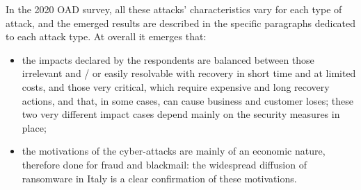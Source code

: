 \documentclass{easychair}
\begin{document}
In the 2020 OAD survey, all these attacks’ characteristics vary for each type of attack, and the emerged results are described in the specific paragraphs dedicated to each attack 
type. At overall it emerges that:
\begin{itemize}
\item the impacts declared by the respondents are balanced between those irrelevant and / or easily resolvable with recovery in short time and at limited costs, and those very 
critical, which require expensive and long recovery actions, and that, in some cases, can cause business and customer loses; these two very different impact cases depend mainly 
on the security measures in place;

\item the motivations of the cyber-attacks are mainly of an economic nature, therefore done for fraud and blackmail: the widespread diffusion of ransomware in Italy is a clear 
confirmation of these motivations.
\end{itemize}
\end{document}
